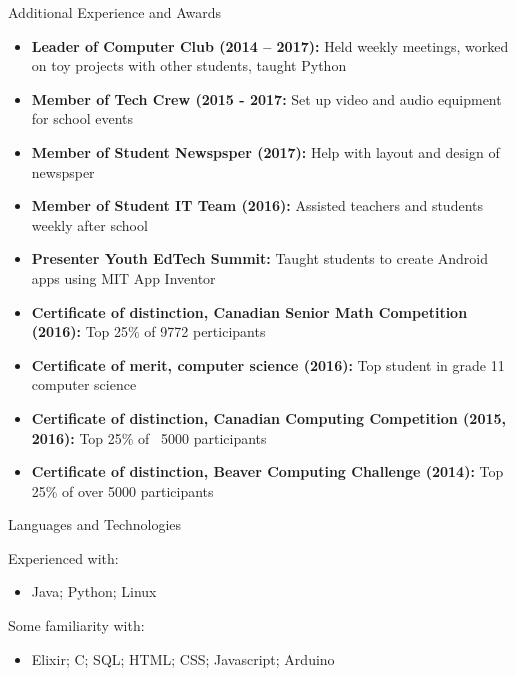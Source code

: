 \documentclass[]{mcdowellcv}
\begin{document}
	\begin{cvsection}{Additional Experience and Awards}
		\begin{cvsubsection}{}{}{}
			\begin{itemize}
				\item \textbf{Leader of Computer Club (2014 – 2017):} Held weekly meetings, worked on toy projects with other students, taught Python
				\item \textbf{Member of Tech Crew (2015 - 2017:} Set up video and audio equipment for school events
				\item \textbf{Member of Student Newspsper (2017):} Help with layout and design of newspsper
				\item \textbf{Member of Student IT Team (2016):} Assisted teachers and students weekly after school
				\item \textbf{Presenter Youth EdTech Summit:} Taught students to create Android apps using MIT App Inventor
				\item \textbf{Certificate of distinction, Canadian Senior Math Competition (2016):} Top 25\% of 9772 perticipants
				\item \textbf{Certificate of merit, computer science (2016):} Top student in grade 11 computer science
				\item \textbf{Certificate of distinction, Canadian Computing Competition (2015, 2016):} Top 25\% of ~5000 participants
				\item \textbf{Certificate of distinction, Beaver Computing Challenge (2014):} Top 25\% of over 5000 participants
			\end{itemize}
		\end{cvsubsection}
	\end{cvsection}

	\begin{cvsection}{Languages and Technologies}
		\begin{cvsubsection}{}{}{}
            Experienced with:
			\begin{itemize}
				\item Java; Python; Linux
            \end{itemize}
            Some familiarity with:
            \begin{itemize}
                \item Elixir; C; SQL; HTML; CSS; Javascript; Arduino
			\end{itemize}
		\end{cvsubsection}
	\end{cvsection}
\end{document}
